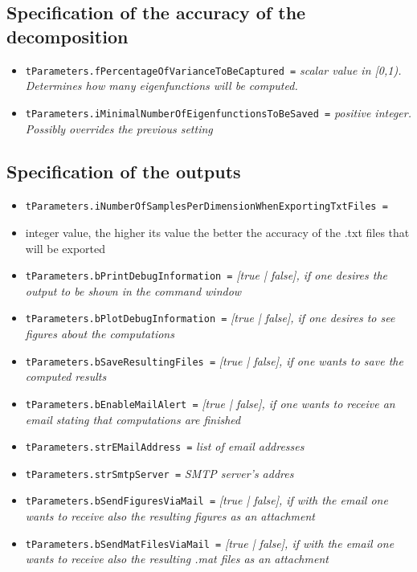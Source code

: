 \documentclass[a4paper, 10pt, twoside]{article} %
\begin{document}
\subsection{Specification of the accuracy of the decomposition}
\label{ssec:accuracy}

\begin{itemize}
	\item \texttt{tParameters.fPercentageOfVarianceToBeCaptured =} \emph{scalar value in [0,1). Determines how many eigenfunctions will be computed.}
	\item \texttt{tParameters.iMinimalNumberOfEigenfunctionsToBeSaved =} \emph{positive integer. Possibly overrides the previous setting}
\end{itemize}


\subsection{Specification of the outputs}
\label{ssec:outputs}

\begin{itemize}
	\item \texttt{tParameters.iNumberOfSamplesPerDimensionWhenExportingTxtFiles =} \item{integer value, the higher its value the better the accuracy of the .txt files that will be exported}
	\item \texttt{tParameters.bPrintDebugInformation =} \emph{[true | false], if one desires the output to be shown in the command window}
	\item \texttt{tParameters.bPlotDebugInformation =} \emph{[true | false], if one desires to see figures about the computations}
	\item \texttt{tParameters.bSaveResultingFiles =} \emph{[true | false], if one wants to save the computed results}
	\item \texttt{tParameters.bEnableMailAlert =} \emph{[true | false], if one wants to receive an email stating that computations are finished}
	\item \texttt{tParameters.strEMailAddress =} \emph{list of email addresses}
	\item \texttt{tParameters.strSmtpServer =} \emph{SMTP server's addres}
	\item \texttt{tParameters.bSendFiguresViaMail =} \emph{[true | false], if with the email one wants to receive also the resulting figures as an attachment}
	\item \texttt{tParameters.bSendMatFilesViaMail =} \emph{[true | false], if with the email one wants to receive also the resulting .mat files as an attachment}
\end{itemize}
\end{document}
